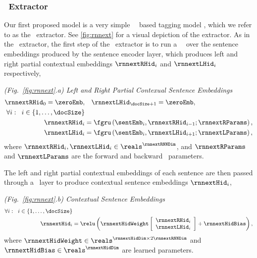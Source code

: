 \subsubsection{\rnnext~Extractor}




    Our first proposed model is a very simple 
    \bidirectional~\recurrentneuralnetwork~based tagging
    model \citep{sometagfolks}, which we refer to as the \rnnext~extractor.
See \autoref{fig:rnnext} for a visual depiction of   
the extractor.
As in the \srext~extractor, the first step of the \rnnext~extractor
is to run a \bidirectional~\recurrentneuralnetwork~over the sentence 
embeddings produced by the sentence encoder layer, which produces
left and right partial contextual embeddings $\rnnextRHid_i$ and $\rnnextLHid_i$
respectively,

  \vspace{10pt} \noindent\textit{(Fig.~\ref{fig:rnnext}.a) Left and Right Partial Contexual Sentence Embeddings}
\begin{align}
    \rnnextRHid_0 = \zeroEmb, &\quad \rnnextLHid_{\docSize+1} = \zeroEmb, \\
    \forall i : \;\; i \in \{1,\ldots,\docSize\}& \nonumber \\
 \rnnextRHid_i &= \fgru\left(\sentEmb_i, \rnnextRHid_{i-1}; \rnnextRParams\right), \\
 \rnnextLHid_i &= \fgru\left(\sentEmb_i, \rnnextLHid_{i+1};\rnnextLParams\right), 
\end{align}
where $\rnnextRHid_i,\rnnextLHid_i \in \reals^{\rnnextRNNDim}$,
and $\rnnextRParams$ and $\rnnextLParams$ are the forward and backward
\gru~parameters.

The left and right partial contextual embeddings of each sentence 
are then passed through a \feedforward~layer to produce contextual
sentence embeddings $\rnnextHid_i$,

\vspace{10pt}\noindent\textit{(Fig.~\ref{fig:rnnext}.b) Contextual Sentence Embeddings}
\begin{align}
    \forall i :\;\; i \in \{1,\ldots,\docSize\}& \nonumber \\
   \rnnextHid_i &= \relu\left(
    \rnnextHidWeight
    \left[ \begin{array}{c} 
        \rnnextRHid_i \\
        \rnnextLHid_i \end{array}\right] + \rnnextHidBias \right),
\end{align}
where $\rnnextHidWeight \in \reals^{\rnnextHidDim \times 2 \rnnextRNNDim}$
and $\rnnextHidBias \in \reals^{\rnnextHidDim}$ are learned parameters.

